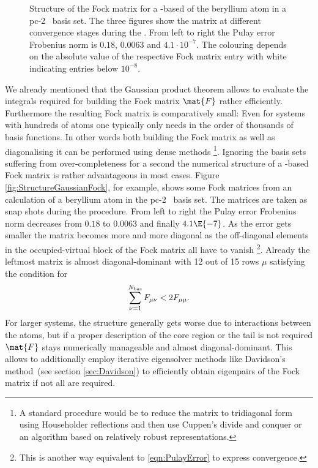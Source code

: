 \begin{sidewaysfigure}
	\centering
	\caption[Structure of the Fock matrix for a \cGTO-based \SCF]
		{Structure of the Fock matrix for a \cGTO-based \SCF
		of the beryllium atom
		in a pc-2~\cite{Jensen2007} basis set.
		The three figures show the matrix
		at different convergence stages during the \SCF.
		From left to right the Pulay error
		Frobenius norm is $0.18$, $0.0063$ and $4.1 \cdot 10^{-7}$.
		The colouring depends on the absolute value
		of the respective Fock matrix entry
		with white indicating entries below $10^{-8}$.
	}
	\label{fig:StructureGaussianFock}
\end{sidewaysfigure}
We already mentioned that the Gaussian product theorem
allows to evaluate the integrals
required for building the Fock matrix $\mat{F}$
rather efficiently.
Furthermore the resulting Fock matrix is comparatively small:
Even for systems with hundreds of atoms one typically only needs
in the order of thousands of basis functions.
In other words both building the Fock matrix
as well as diagonalising it can be performed using dense methods%
\noindent
\footnote{%
	A standard procedure would be to reduce the matrix to
	tridiagonal form using Householder reflections
	and then use Cuppen's divide and conquer
	or an algorithm based on relatively robust representations.
}.
Ignoring the basis sets suffering from over-completeness for a second
the numerical structure of a \cGTO-based Fock matrix
is rather advantageous in most cases.
Figure \vref{fig:StructureGaussianFock}, for example,
shows some Fock matrices from an \SCF calculation
of a beryllium atom
in the pc-2~\cite{Jensen2007} basis set.
The matrices are taken as snap shots during the \SCF procedure.
From left to right the Pulay error Frobenius norm decreases
from $0.18$ to $0.0063$ and finally $4.1\E{-7}$.
As the error gets smaller the matrix becomes more and more diagonal
as the off-diagonal elements in the occupied-virtual block of the
Fock matrix all have to vanish%
\footnote{This is another way equivalent to \eqref{eqn:PulayError}
to express \SCF convergence.}.
Already the leftmost matrix is almost diagonal-dominant with 12
out of 15 rows $\mu$
satisfying the condition for 
\[
	\sum_{\nu=1}^{N_\text{bas}} F_{\mu\nu} < 2 F_{\mu\mu}.
\]
For larger systems, the structure generally gets
worse due to interactions between the atoms,
but if a proper description of the core region or the tail is not required
$\mat{F}$ stays numerically manageable and almost diagonal-dominant.
This allows to additionally employ
iterative eigensolver methods like Davidson's method~(see section \vref{sec:Davidson})
to efficiently obtain eigenpairs of the Fock matrix if not all are required.

